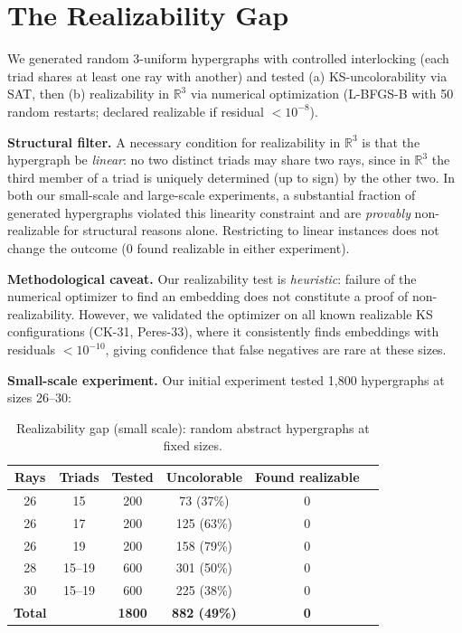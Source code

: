 \documentclass[12pt,a4paper]{article}
\newcommand{\R}{\mathbb{R}}
\begin{document}
\section{The Realizability Gap}\label{sec:realizability}

We generated random 3-uniform hypergraphs with controlled interlocking (each triad shares at least one ray with another) and tested (a) KS-uncolorability via SAT, then (b) realizability in $\R^3$ via numerical optimization (L-BFGS-B with 50 random restarts; declared realizable if residual $< 10^{-8}$).

\textbf{Structural filter.} A necessary condition for realizability in $\R^3$ is that the hypergraph be \emph{linear}: no two distinct triads may share two rays, since in $\R^3$ the third member of a triad is uniquely determined (up to sign) by the other two. In both our small-scale and large-scale experiments, a substantial fraction of generated hypergraphs violated this linearity constraint and are \emph{provably} non-realizable for structural reasons alone. Restricting to linear instances does not change the outcome (0 found realizable in either experiment).

\textbf{Methodological caveat.} Our realizability test is \emph{heuristic}: failure of the numerical optimizer to find an embedding does not constitute a proof of non-realizability. However, we validated the optimizer on all known realizable KS configurations (CK-31, Peres-33), where it consistently finds embeddings with residuals $< 10^{-10}$, giving confidence that false negatives are rare at these sizes.

\textbf{Small-scale experiment.} Our initial experiment tested 1{,}800 hypergraphs at sizes 26--30:

\begin{table}[ht]
\centering
\caption{Realizability gap (small scale): random abstract hypergraphs at fixed sizes.}
\label{tab:realizability}
\begin{tabular}{cccccc}
\toprule
Rays & Triads & Tested & Uncolorable & Found realizable \\
\midrule
26 & 15 & 200 & 73 (37\%) & 0 \\
26 & 17 & 200 & 125 (63\%) & 0 \\
26 & 19 & 200 & 158 (79\%) & 0 \\
28 & 15--19 & 600 & 301 (50\%) & 0 \\
30 & 15--19 & 600 & 225 (38\%) & 0 \\
\midrule
\textbf{Total} & & \textbf{1800} & \textbf{882 (49\%)} & \textbf{0} \\
\bottomrule
\end{tabular}
\end{table}
\end{document}

